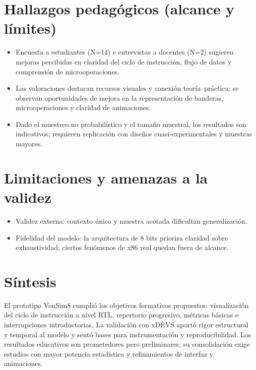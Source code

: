 \documentclass[12pt,oneside]{templates/unerthesis}
\providecommand{\tightlist}{%
  \setlength{\itemsep}{0pt}\setlength{\parskip}{0pt}}
\begin{document}
\hypertarget{hallazgos-pedaguxf3gicos-alcance-y-luxedmites}{%
\section{Hallazgos pedagógicos (alcance y límites)}\label{hallazgos-pedaguxf3gicos-alcance-y-luxedmites}}

\begin{itemize}
\tightlist
\item
  Encuesta a estudiantes (N=14) e entrevistas a docentes (N=2) sugieren mejoras percibidas en claridad del ciclo de instrucción, flujo de datos y comprensión de microoperaciones.
\item
  Las valoraciones destacan recursos visuales y conexión teoría--práctica; se observan oportunidades de mejora en la representación de banderas, microoperaciones y claridad de animaciones.
\item
  Dado el muestreo no probabilístico y el tamaño muestral, los resultados son indicativos; requieren replicación con diseños cuasi‑experimentales y muestras mayores.
\end{itemize}

\hypertarget{limitaciones-y-amenazas-a-la-validez}{%
\section{Limitaciones y amenazas a la validez}\label{limitaciones-y-amenazas-a-la-validez}}

\begin{itemize}
\tightlist
\item
  Validez externa: contexto único y muestra acotada dificultan generalización.
\item
  Fidelidad del modelo: la arquitectura de 8 bits prioriza claridad sobre exhaustividad; ciertos fenómenos de x86 real quedan fuera de alcance.
\end{itemize}

\hypertarget{suxedntesis}{%
\section{Síntesis}\label{suxedntesis}}

El prototipo VonSim8 cumplió los objetivos formativos propuestos: visualización del ciclo de instrucción a nivel RTL, repertorio progresivo, métricas básicas e interrupciones introductorias. La validación con xDEVS aportó rigor estructural y temporal al modelo y sentó bases para instrumentación y reproducibilidad. Los resultados educativos son prometedores pero preliminares; su consolidación exige estudios con mayor potencia estadística y refinamientos de interfaz y animaciones.
\end{document}
